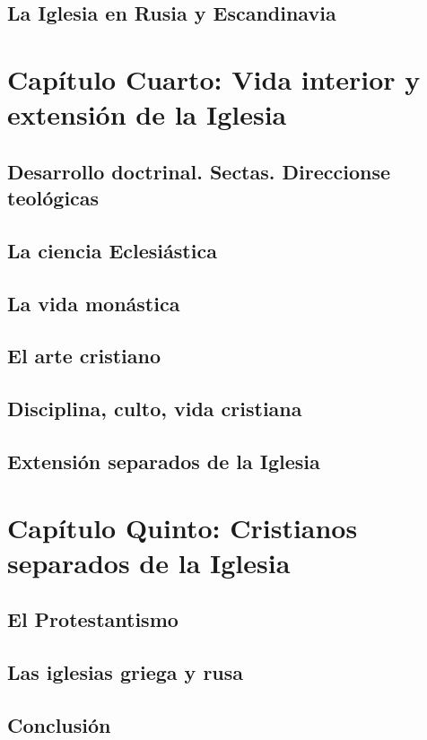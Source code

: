 \raggedbottom{} \documentclass[12pt, a4paper, openany]{book} %
\begin{document}
\section{La Iglesia en Rusia y Escandinavia}
\chapter{Capítulo Cuarto: Vida interior y extensión de la Iglesia}
\section{Desarrollo doctrinal. Sectas. Direccionse teológicas}
\section{La ciencia Eclesiástica}
\section{La vida monástica}
\section{El arte cristiano}
\section{Disciplina, culto, vida cristiana}
\section{Extensión separados de la Iglesia}
\chapter{Capítulo Quinto: Cristianos separados de la Iglesia}
\section{El Protestantismo}
\section{Las iglesias griega y rusa}
\section{Conclusión}
\printbibliography[heading=bibintoc]
\end{document}
